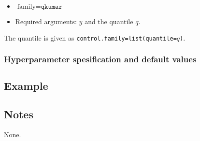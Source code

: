 \documentclass[a4paper,11pt]{article}
\begin{document}
\begin{itemize}
\item $\text{family}=\texttt{qkumar}$
\item Required arguments: $y$ and the quantile $q$. 
\end{itemize}
The quantile is given as \texttt{control.family=list(quantile=$q$)}.

\subsubsection*{Hyperparameter spesification and default values}




\subsection*{Example}



\subsection*{Notes}

None.
\end{document}
